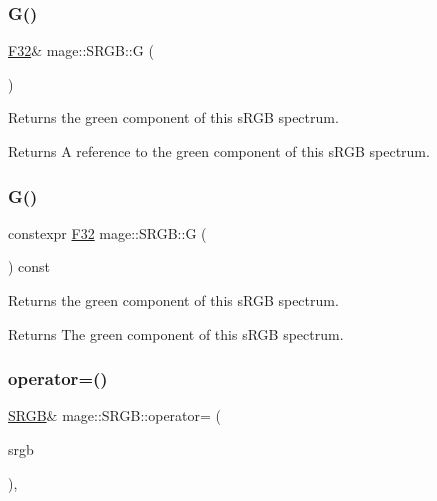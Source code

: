 \subsubsection{\texorpdfstring{G()}{G()}\hspace{0.1cm}{\footnotesize\ttfamily [1/2]}}
{\footnotesize\ttfamily \mbox{\hyperlink{namespacemage_aa97e833b45f06d60a0a9c4fc22ae02c0}{F32}}\& mage\+::\+S\+R\+G\+B\+::G (\begin{DoxyParamCaption}{ }\end{DoxyParamCaption})\hspace{0.3cm}{\ttfamily [noexcept]}}

Returns the green component of this s\+R\+GB spectrum.

\begin{DoxyReturn}{Returns}
A reference to the green component of this s\+R\+GB spectrum. 
\end{DoxyReturn}
\mbox{\label{structmage_1_1_s_r_g_b_a4d5f1ba05db3b00d17525bc9fcbf1352}} 
\subsubsection{\texorpdfstring{G()}{G()}\hspace{0.1cm}{\footnotesize\ttfamily [2/2]}}
{\footnotesize\ttfamily constexpr \mbox{\hyperlink{namespacemage_aa97e833b45f06d60a0a9c4fc22ae02c0}{F32}} mage\+::\+S\+R\+G\+B\+::G (\begin{DoxyParamCaption}{ }\end{DoxyParamCaption}) const\hspace{0.3cm}{\ttfamily [noexcept]}}

Returns the green component of this s\+R\+GB spectrum.

\begin{DoxyReturn}{Returns}
The green component of this s\+R\+GB spectrum. 
\end{DoxyReturn}
\mbox{\label{structmage_1_1_s_r_g_b_a08c0aaef872868f2415b5d58c5611764}} 
\subsubsection{\texorpdfstring{operator=()}{operator=()}\hspace{0.1cm}{\footnotesize\ttfamily [1/2]}}
{\footnotesize\ttfamily \mbox{\hyperlink{structmage_1_1_s_r_g_b}{S\+R\+GB}}\& mage\+::\+S\+R\+G\+B\+::operator= (\begin{DoxyParamCaption}\item[{const \mbox{\hyperlink{structmage_1_1_s_r_g_b}{S\+R\+GB}} \&}]{srgb }\end{DoxyParamCaption})\hspace{0.3cm}{\ttfamily [default]}, {\ttfamily [noexcept]}}

